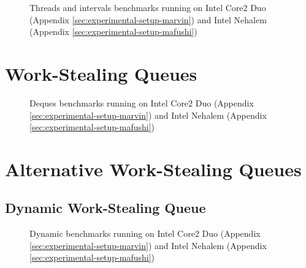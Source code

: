 \begin{figure}[ht]
  \centering
  \caption{Threads and intervals benchmarks running on Intel Core2 Duo
    (Appendix \ref{sec:experimental-setup-marvin}) and Intel
    Nehalem (Appendix \ref{sec:experimental-setup-mafushi})}
  \label{fig:queues-evaluation-threads}
\end{figure}


\section{Work-Stealing Queues}
\label{sec:queues-performance-ws}

\begin{figure}[ht]
  \centering
  \caption{Deques benchmarks running on Intel Core2 Duo (Appendix
    \ref{sec:experimental-setup-marvin}) and Intel Nehalem (Appendix
    \ref{sec:experimental-setup-mafushi})}
  \label{fig:queues-evaluation-threads}
\end{figure}


\section{Alternative Work-Stealing Queues}
\label{sec:queues-performance-alternative}

\subsection{Dynamic Work-Stealing Queue}
\label{sec:queues-performance-alternative-dynamic}

\begin{figure}[ht]
  \centering
  \caption{Dynamic benchmarks running on Intel Core2 Duo (Appendix
    \ref{sec:experimental-setup-marvin}) and Intel Nehalem (Appendix
    \ref{sec:experimental-setup-mafushi})}
  \label{fig:queues-evaluation-threads}
\end{figure}

